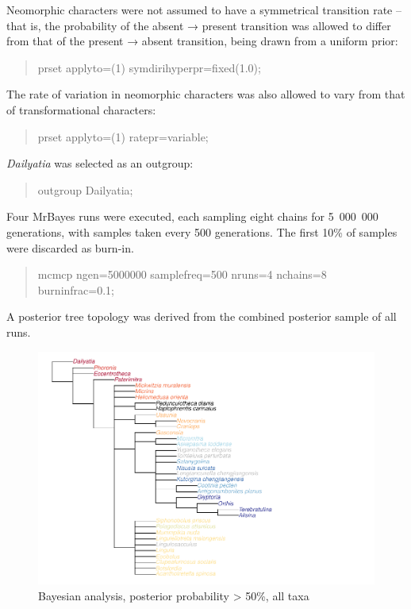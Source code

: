 \documentclass[openany]{book}
\theoremstyle{definition}
\theoremstyle{definition}
\theoremstyle{definition}
\theoremstyle{remark}
\begin{document}
Neomorphic characters were not assumed to have a symmetrical transition
rate -- that is, the probability of the absent → present transition was
allowed to differ from that of the present → absent transition, being
drawn from a uniform prior:

\begin{quote}
prset applyto=(1) symdirihyperpr=fixed(1.0);
\end{quote}

The rate of variation in neomorphic characters was also allowed to vary
from that of transformational characters:

\begin{quote}
prset applyto=(1) ratepr=variable;
\end{quote}

\emph{Dailyatia} was selected as an outgroup:

\begin{quote}
outgroup Dailyatia;
\end{quote}

Four MrBayes runs were executed, each sampling eight chains for
5~000~000 generations, with samples taken every 500 generations. The
first 10\% of samples were discarded as burn-in.

\begin{quote}
mcmcp ngen=5000000 samplefreq=500 nruns=4 nchains=8 burninfrac=0.1;
\end{quote}

A posterior tree topology was derived from the combined posterior sample
of all runs.

\begin{figure}
\centering
\includegraphics{Brachiopod_phylogeny_files/figure-latex/mrbayes-full-consensus-1.pdf}
\caption{\label{fig:mrbayes-full-consensus}Bayesian analysis, posterior
probability \textgreater{} 50\%, all taxa}
\end{figure}
\end{document}
